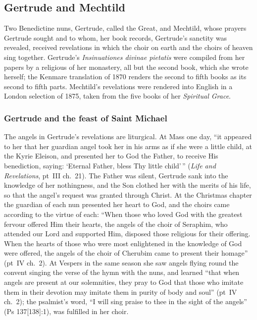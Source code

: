 \sectionguard\subsection{Gertrude and Mechtild}\label{sec:sa-helfta}

Two Benedictine nuns, Gertrude, called the Great, and Mechtild, whose
prayers Gertrude sought and to whom, her book records, Gertrude's sanctity
was revealed, received revelations in which the choir on earth and the
choirs of heaven sing together. Gertrude's \emph{Insinuationes divinae
pietatis} were compiled from her papers by a religious of her monastery, all
but the second book, which she wrote herself; the Kenmare translation of
1870 renders the second to fifth books as its second to fifth parts.
Mechtild's revelations were rendered into English in a London selection of
1875, taken from the five books of her \emph{Spiritual Grace}.

\subsubsection{Gertrude and the feast of Saint Michael}

The angels in Gertrude's revelations are liturgical. At Mass one day, ``it
appeared to her that her guardian angel took her in his arms as if she were
a little child, at the Kyrie Eleison, and presented her to God the Father,
to receive His benediction, saying: `Eternal Father, bless Thy little
child'\,'' (\emph{Life and Revelations}, pt~III ch.~21). The Father was
silent, Gertrude sank into the knowledge of her nothingness, and the Son
clothed her with the merits of his life, so that the angel's request was
granted through Christ. At the Christmas chapter the guardian of each nun
presented her heart to God, and the choirs came according to the virtue of
each: ``When those who loved God with the greatest fervour offered Him their
hearts, the angels of the choir of Seraphim, who attended our Lord and
supported Him, disposed those religious for their offering. When the hearts
of those who were most enlightened in the knowledge of God were offered, the
angels of the choir of Cherubim came to present their homage'' (pt~IV
ch.~2). At Vespers in the same season she saw angels flying round the
convent singing the verse of the hymn with the nuns, and learned ``that when
angels are present at our solemnities, they pray to God that those who
imitate them in their devotion may imitate them in purity of body and
soul'' (pt~IV ch.~2); the psalmist's word, ``I will sing praise to thee in
the sight of the angels'' (Ps 137[138]:1), was fulfilled in her choir.

